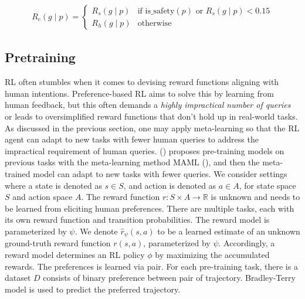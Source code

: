 \documentclass[
  letterpaper,
  numbers=noenddot,
  DIV=11]{scrreprt}
\theoremstyle{plain}
\theoremstyle{definition}
\theoremstyle{remark}
\begin{document}
\[
\begin{aligned}
    R_c(g \mid p) =
    \begin{cases}
        R_s(g \mid p) & \text{if } \text{is\_safety}(p) \text{ or } R_s(g \mid p) < 0.15 \\
        R_h(g \mid p) & \text{otherwise}
    \end{cases}
\end{aligned}
\]

\subsection{Pretraining}\label{pretraining}

RL often stumbles when it comes to devising reward functions aligning
with human intentions. Preference-based RL aims to solve this by
learning from human feedback, but this often demands a \emph{highly
impractical number of queries} or leads to oversimplified reward
functions that don't hold up in real-world tasks. As discussed in the
previous section, one may apply meta-learning so that the RL agent can
adapt to new tasks with fewer human queries to address the impractical
requirement of human queries. () proposes pre-training models on previous tasks with the
meta-learning method MAML (), and then the meta-trained model can adapt to new
tasks with fewer queries. We consider settings where a state is denoted
as \(s\in S\), and action is denoted as \(a\in A\), for state space
\(S\) and action space \(A\). The reward function
\(r: S\times A \to \mathbb{R}\) is unknown and needs to be learned from
eliciting human preferences. There are multiple tasks, each with its own
reward function and transition probabilities. The reward model is
parameterized by \(\psi\). We denote \(\hat{r}_\psi(s, a)\) to be a
learned estimate of an unknown ground-truth reward function \(r(s, a)\),
parameterized by \(\psi\). Accordingly, a reward model determines an RL
policy \(\phi\) by maximizing the accumulated rewards. The preferences
is learned via pair. For each pre-training task, there is a dataset
\(D\) consists of binary preference between pair of trajectory.
Bradley-Terry model is used to predict the preferred trajectory.
\end{document}
